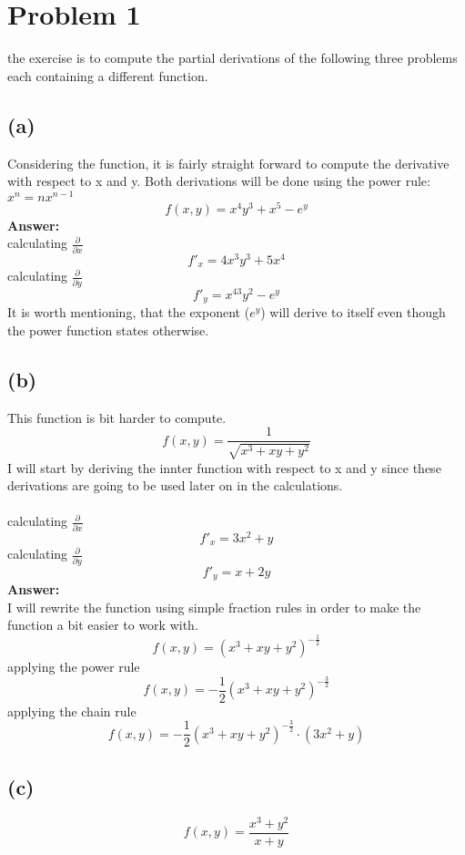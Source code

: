 \section{Problem 1}
the exercise is to compute the partial derivations of the following
three problems each containing a different function.
\subsection{(a)}
Considering the function, it is fairly straight forward to compute the derivative with respect
to x and y. Both derivations will be done using the power rule: $x^n = nx^{n-1}$
$$f(x,y) = x^4y^3+x^5-e^y$$
\textbf{Answer:}
\\
calculating $\frac{\partial}{\partial x}$
$$f'_{x} = 4x^3y^3+5x^4$$
calculating $\frac{\partial}{\partial y}$
$$f'_{y} = x^43y^2-e^y$$
It is worth mentioning, that the exponent ($e^y$) will derive to itself even though
the power function states otherwise.
\subsection{(b)}
This function is bit harder to compute.
$$f(x,y) = \frac{1}{\sqrt{x^3+xy+y^2}}$$
I will start by deriving the innter function with respect to x and y since these derivations
are going to be used later on in the calculations.
\\
\\
calculating $\frac{\partial}{\partial x}$
$$f'_{x} = 3x^2+y$$
calculating $\frac{\partial}{\partial y}$
$$f'_{y} = x+2y$$
\textbf{Answer:}\\
I will rewrite the function using simple fraction rules in order to make the function
a bit easier to work with.
$$f(x,y) = (x^3+xy+y^2)^{-\frac{1}{2}}$$
applying the power rule
$$f(x,y) = -\frac{1}{2}(x^3+xy+y^2)^{-\frac{3}{2}}$$
applying the chain rule
$$f(x,y) = -\frac{1}{2}(x^3+xy+y^2)^{-\frac{3}{2}} \cdot (3x^2+y)$$
\subsection{(c)}
$$f(x,y) = \frac{x^3+y^2}{x+y}$$